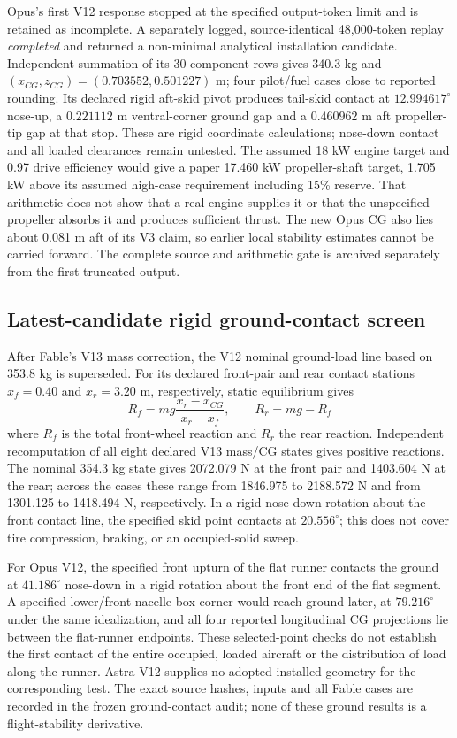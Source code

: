 \documentclass[10pt,letterpaper]{article}
\begin{document}
Opus's first V12 response stopped at the specified output-token limit and is retained as incomplete. A separately logged, source-identical 48,000-token replay \emph{completed} and returned a non-minimal analytical installation candidate. Independent summation of its 30 component rows gives 340.3 kg and $(x_{CG},z_{CG})=(0.703552,0.501227)$ m; four pilot/fuel cases close to reported rounding. Its declared rigid aft-skid pivot produces tail-skid contact at $12.994617^\circ$ nose-up, a $0.221112$ m ventral-corner ground gap and a $0.460962$ m aft propeller-tip gap at that stop. These are rigid coordinate calculations; nose-down contact and all loaded clearances remain untested. The assumed 18 kW engine target and 0.97 drive efficiency would give a paper 17.460 kW propeller-shaft target, 1.705 kW above its assumed high-case requirement including 15\% reserve. That arithmetic does not show that a real engine supplies it or that the unspecified propeller absorbs it and produces sufficient thrust. The new Opus CG also lies about 0.081 m aft of its V3 claim, so earlier local stability estimates cannot be carried forward. The complete source and arithmetic gate is archived separately from the first truncated output.

\subsection{Latest-candidate rigid ground-contact screen}
After Fable's V13 mass correction, the V12 nominal ground-load line based on
353.8 kg is superseded. For its declared front-pair and rear contact stations
$x_f=0.40$ and $x_r=3.20$ m, respectively, static equilibrium gives
\begin{equation}\label{eq:groundreactions}
R_f=mg\frac{x_r-x_{CG}}{x_r-x_f},\qquad R_r=mg-R_f
\end{equation}
where $R_f$ is the total front-wheel reaction and $R_r$ the rear reaction.
Independent recomputation of all eight declared V13 mass/CG states gives
positive reactions. The nominal 354.3 kg state gives 2072.079 N at the front
pair and 1403.604 N at the rear; across the cases these range from 1846.975
to 2188.572 N and from 1301.125 to 1418.494 N, respectively. In a rigid
nose-down rotation about the front contact line, the specified skid point
contacts at $20.556^\circ$; this does not cover tire compression, braking,
or an occupied-solid sweep.

For Opus V12, the specified front upturn of the flat runner contacts the
ground at $41.186^\circ$ nose-down in a rigid rotation about the front end
of the flat segment. A specified lower/front nacelle-box corner would reach
ground later, at $79.216^\circ$ under the same idealization, and all four
reported longitudinal CG projections lie between the flat-runner endpoints.
These selected-point checks do not establish the first contact of the entire
occupied, loaded aircraft or the distribution of load along the runner.
Astra V12 supplies no adopted installed geometry for the corresponding test.
The exact source hashes, inputs and all Fable cases are recorded in the frozen
ground-contact audit; none of these ground results is a flight-stability
derivative.
\end{document}
